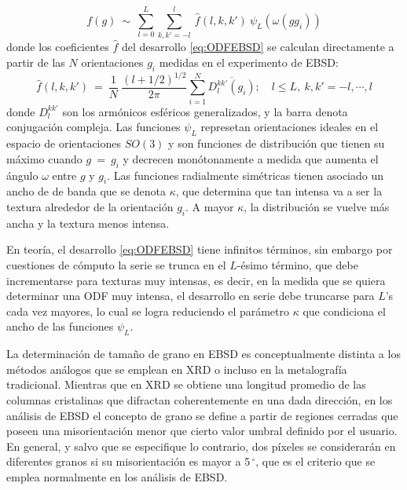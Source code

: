 \begin{equation}
  f(g) \ \sim \ \sum_{l=0}^{L} \sum_{k,k'=-l}^{l} \ \hat{f}(l, k, k') \ \psi_L(\omega(gg_i)) 
  \label{eq:ODFEBSD}
\end{equation}
\noindent
donde los coeficientes $\hat{f}$ del desarrollo \ref{eq:ODFEBSD} se calculan directamente a partir de las $N$ orientaciones $g_i$ medidas en el experimento de EBSD:
\begin{equation}
  \hat{f}(l, k, k') \ = \ \frac{1}{N} \ \frac{(l + 1/2)^{1/2}}{2 \pi} \sum_{i=1}^{N} \overline{D_l^{k k'} (g_i)}; \quad l \leq L, \ k, k' = -l, \cdots, l
  \label{eq:ODFcoef}
\end{equation}
\noindent
donde $D_l^{k k'}$ son los armónicos esféricos generalizados, y la barra denota conjugación compleja. Las funciones $\psi_L$ represetan orientaciones ideales en el espacio de orientaciones $SO(3)$ y son funciones de distribución que tienen su máximo cuando $g \ = \ g_i$ y decrecen monótonamente a medida que aumenta el ángulo $\omega$ entre $g$ y $g_i$.
Las funciones radialmente simétricas tienen asociado un ancho de de banda que se denota $\kappa$, que determina que tan intensa va a ser la textura alrededor de la orientación $g_i$.
A mayor $\kappa$, la distribución se vuelve más ancha y la textura menos intensa.

En teoría, el desarrollo \ref{eq:ODFEBSD} tiene infinitos términos, sin embargo por cuestiones de cómputo la serie se trunca en el $L$-ésimo término, que debe incrementarse para texturas muy intensas, es decir, en la medida que se quiera determinar una ODF muy intensa, el desarrollo en serie debe truncarse para $L$'s cada vez mayores, lo cual se logra reduciendo el parámetro $\kappa$ que condiciona el ancho de las funciones $\psi_L$.

La determinación de tamaño de grano en EBSD es conceptualmente distinta a los métodos análogos que se emplean en XRD o incluso en la metalografía tradicional.
Mientras que en XRD se obtiene una longitud promedio de las columnas cristalinas que difractan coherentemente en una dada dirección, en los análisis de EBSD el concepto de grano se define a partir de regiones cerradas que poseen una misorientación menor que cierto valor umbral definido por el usuario.
En general, y salvo que se especifique lo contrario, dos píxeles se considerarán en diferentes granos si su misorientación es mayor a 5\,$^{\circ}$, que es el criterio que se emplea normalmente en los análisis de EBSD.

